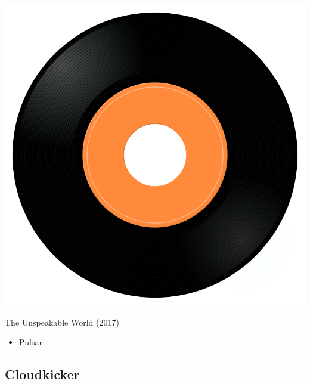 \begin{minipage}[t]{0.25\textwidth}
\captionsetup{type=figure}
\includegraphics[width=\textwidth]{Images/cover.png}
\caption*{The Unspeakable World (2017)}
\end{minipage}
\begin{minipage}[t]{0.25\textwidth}\vspace{0pt}
\begin{itemize}[nosep,leftmargin=1em,labelwidth=*,align=left]
	\setlength{\itemsep}{0pt}
	\item Pulsar
\end{itemize}
\end{minipage}

\subsection{Cloudkicker}

